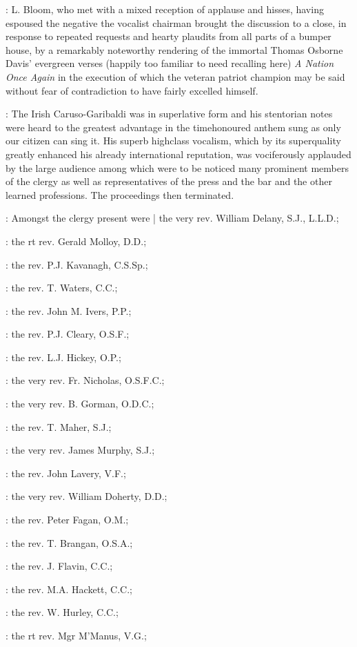 :
L.
Bloom,
who met with a mixed reception of applause and
hisses,
having espoused the negative the vocalist chairman brought the
discussion to a close,
in response to repeated requests and hearty
plaudits from all parts of a bumper house,
by a remarkably noteworthy
rendering of the immortal Thomas Osborne Davis' evergreen verses (happily
too familiar to need recalling here) \emph{A Nation Once Again} in the execution
of which the veteran patriot champion may be said without fear of
contradiction to have fairly excelled himself.

:
The Irish Caruso-Garibaldi
was in superlative form
and his stentorian notes were heard to the
greatest advantage in the timehonoured anthem sung as only our citizen
can sing it.
His superb highclass vocalism,
which by its superquality
greatly enhanced his already international reputation,
was vociferously
applauded by the large audience among which were to be noticed many
prominent members of the clergy as well as representatives of the press
and the bar and the other learned professions.
The proceedings then terminated.

:
Amongst the clergy present were |
the very rev. William Delany, S.J., L.L.D.;

:
the rt rev. Gerald Molloy, D.D.;

:
the rev. P.J. Kavanagh, C.S.Sp.;

:
the rev. T. Waters, C.C.;


:
the rev. John M. Ivers, P.P.;

:
the rev. P.J. Cleary, O.S.F.;

:
the rev. L.J. Hickey, O.P.;


:
the very rev. Fr. Nicholas, O.S.F.C.;


:
the very rev. B. Gorman, O.D.C.;

:
the rev. T. Maher, S.J.;

:
the very rev. James Murphy, S.J.;

:
the rev. John Lavery, V.F.;

:
the very rev. William Doherty, D.D.;

:
the rev. Peter Fagan, O.M.;

:
the rev. T. Brangan, O.S.A.;

:
the rev. J. Flavin, C.C.;

:
the rev. M.A. Hackett, C.C.;

:
the rev. W. Hurley, C.C.;

:
the rt rev. Mgr M'Manus, V.G.;

